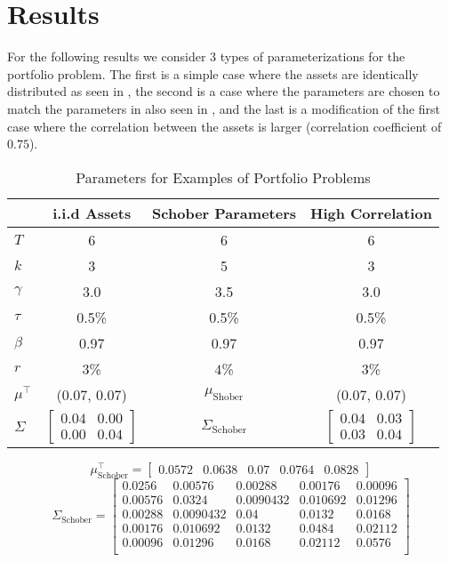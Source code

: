 \documentclass[11pt]{article}
\begin{document}
\fi

\section{Results} \label{Section: Results}
For the following results we consider 3 types of parameterizations for the portfolio problem.
The first is a simple case where the assets are identically distributed as seen in \autocite{CaiJuddXu2013},
the second is a case where the parameters are chosen to match the parameters in \autocite{Schober2022} also seen in \autocite{Scheidegger2023},
and the last is a modification of the first case where the correlation between the assets is larger (correlation coefficient of $0.75$).
\begin{table}[!ht]
    \label{table: Parameters_Base_Models}
    \centering
    \caption{Parameters for Examples of Portfolio Problems}
    \begin{tabular}{lccc}
    \toprule
    & \textbf{i.i.d Assets} & \textbf{Schober Parameters} & \textbf{High Correlation} \\
    \midrule
    $T$        & 6                & 6                & 6                \\
    $k$        & 3                & 5                & 3                \\
    $\gamma$   & 3.0              & 3.5              & 3.0              \\
    $\tau$     & 0.5\%            & 0.5\%            & 0.5\%            \\
    $\beta$    & 0.97             & 0.97             & 0.97             \\
    $r$        & $3$\% & $4$\%    &  $3$\% \\
    $\mu^\top$ & (0.07, 0.07) & $\mu_{\text{Shober}}$ & (0.07, 0.07) \\
    $\Sigma$   & 
    $\begin{bmatrix}
    0.04 & 0.00 \\
    0.00 & 0.04
    \end{bmatrix}$
    & $\Sigma_{\text{Schober}}$ 
    & 
    $\begin{bmatrix}
    0.04 & 0.03\\
    0.03 & 0.04
    \end{bmatrix}$ \\
    \bottomrule
    \end{tabular}
\end{table}
\[
\mu_{\text{Schober}}^\top = 
\begin{bmatrix}
0.0572 & 0.0638 & 0.07 & 0.0764 & 0.0828
\end{bmatrix}
\]
\[
\Sigma_{\text{Schober}} = 
\begin{bmatrix}
0.0256 & 0.00576 & 0.00288 & 0.00176 & 0.00096 \\
0.00576 & 0.0324 & 0.0090432 & 0.010692 & 0.01296 \\
0.00288 & 0.0090432 & 0.04 & 0.0132 & 0.0168 \\
0.00176 & 0.010692 & 0.0132 & 0.0484 & 0.02112 \\
0.00096 & 0.01296 & 0.0168 & 0.02112 & 0.0576 \\
\end{bmatrix}
\]
\end{document}

